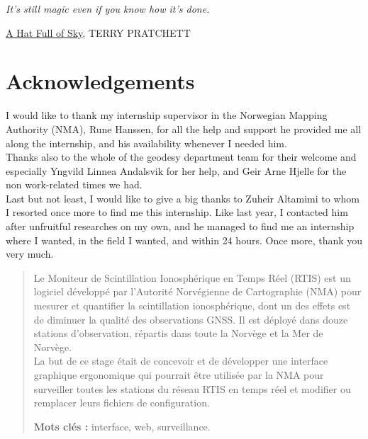 \documentclass{themeensg}
\newlength\longest
\begin{document}
\clearpage

\thispagestyle{empty}
\null\vfill

\settowidth{}
\begin{center}
\parbox{\longest}{
  \raggedright{\huge\itshape
  It's still magic even if you know how it's done.\par\bigskip
  }
  \raggedleft\Large\underline{A Hat Full of Sky}\MakeUppercase{, Terry Pratchett}\par%
}
\end{center}
\vfill\vfill

\clearpage

\newevenpage
\chapter*{Acknowledgements}

I would like to thank my internship supervisor in the Norwegian Mapping Authority (NMA), Rune Hanssen, for all the help and support he provided me all along the internship, and his availability whenever I needed him.\\

Thanks also to the whole of the geodesy department team for their welcome and especially Yngvild Linnea Andalsvik for her help, and Geir Arne Hjelle for the non work-related times we had.\\

Last but not least, I would like to give a big thanks to Zuheir Altamimi to whom I resorted once more to find me this internship. Like last year, I contacted him after unfruitful researches on my own, and he managed to find me an internship where I wanted, in the field I wanted, and within 24 hours. Once more, thank you very much.

\begin{abstract}
\thispagestyle{empty}
	\vspace{1cm}

	Le Moniteur de Scintillation Ionosphérique en Temps Réel (RTIS) est un logiciel développé par l'Autorité  Norvégienne de Cartographie (NMA) pour mesurer et quantifier la scintillation ionosphérique, dont un des effets est de diminuer la qualité des observations GNSS. Il est déployé dans douze stations d'observation, répartis dans toute la Norvège et la Mer de Norvège. \\
	La but de ce stage était de concevoir et de développer une interface graphique ergonomique qui pourrait être utilisée par la NMA pour surveiller toutes les stations du réseau RTIS en temps réel et modifier ou remplacer leurs fichiers de configuration.
	\vspace{1.5cm}
	
	\textbf{Mots clés :} interface, web, surveillance.
\end{abstract}
\end{document}
